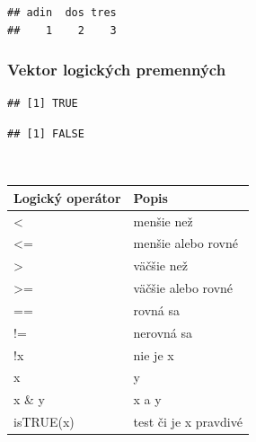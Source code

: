 \begin{Shaded}
\begin{Highlighting}[]
\StringTok{ }\NormalTok{(}\NormalTok{, }\NormalTok{, }\NormalTok{)}

\end{Highlighting}
\end{Shaded}

\begin{verbatim}
## adin  dos tres 
##    1    2    3
\end{verbatim}

\hypertarget{vektor-logickuxfdch-premennuxfdch}{%
\subsubsection{Vektor logických
premenných}\label{vektor-logickuxfdch-premennuxfdch}}

\begin{Shaded}
\begin{Highlighting}[]

\StringTok{  }

\OperatorTok{==}\StringTok{ }
\end{Highlighting}
\end{Shaded}

\begin{verbatim}
## [1] TRUE
\end{verbatim}

\begin{Shaded}
\begin{Highlighting}[]
\OperatorTok{==}\StringTok{ }
\end{Highlighting}
\end{Shaded}

\begin{verbatim}
## [1] FALSE
\end{verbatim}

~

\begin{longtable}[]{@{}ll@{}}
\toprule
Logický operátor & Popis\tabularnewline
\midrule
\endhead
\textless{} & menšie než\tabularnewline
\textless= & menšie alebo rovné\tabularnewline
\textgreater{} & väčšie než\tabularnewline
\textgreater= & väčšie alebo rovné\tabularnewline
== & rovná sa\tabularnewline
!= & nerovná sa\tabularnewline
!x & nie je x\tabularnewline
x & y\tabularnewline
x \& y & x a y\tabularnewline
isTRUE(x) & test či je x pravdivé\tabularnewline
\bottomrule
\end{longtable}

